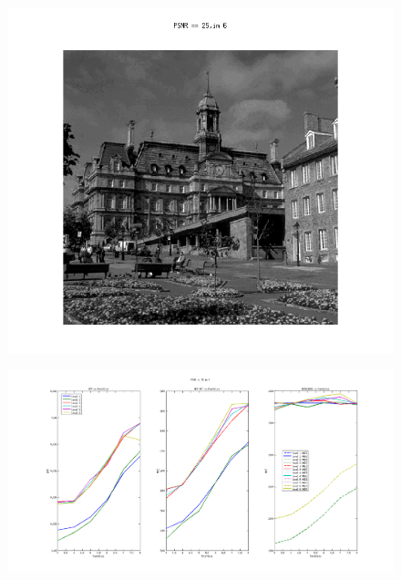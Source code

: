 \documentclass{article}
\begin{document}
\newpage 
\begin{figure}[h]
\centering
    \begin{center}
       \includegraphics[scale=0.3]{6.png}
    \end{center}
    \noindent
\end{figure}
\begin{figure}[h]
\centering
  
    \begin{center}
       \includegraphics[width=180mm]{fig6L.png}
     
    \end{center}
\end{figure}
\end{document}
